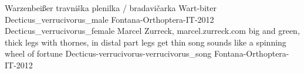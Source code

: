 {Warzenbeißer} %
{travni\v{s}ka plenilka / bradavi\v{c}arka} %
{Wart-biter} %
{Decticus_verrucivorus_male}  %
{Fontana-Orthoptera-IT-2012} %
{Decticus_verrucivorus_female} %
{Marcel Zurreck, marcel.zurreck.com} %
{big and green, thick legs with thornes, in distal part legs get thin} %
{song sounds like a spinning wheel of fortune} %
{Decticus-verrucivorus-verrucivorus_song} %
{Fontana-Orthoptera-IT-2012} %
